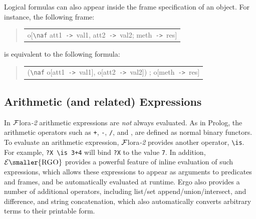\documentclass[11pt]{article}
\newcommand{\FLORA}{{\mbox{\sc ${\cal F}${lora}\rm\emph{-2}}}\xspace}
\newcommand{\ERGO}{\ensuremath{\cal{E}\mbox{\smaller{\sc{RGO}}}}\xspace}
\newcommand{\FLSYSTEM}{\FLORA}
\newenvironment{qrules}{\begin{quote}\tt\begin{tabular}[t]{l}}%
{\end{tabular}\end{quote}}
\newcommand{\mvd}{{\mbox{\tt \,->\,}}}  %
\newcommand{\bs}{\textbackslash}
\newcommand{\RULELOGNAF}{{\texttt{{\bs}naf}}\xspace}
\begin{document}
%
Logical formulas can also appear inside the frame specification of an object. For
instance, the following frame:
\begin{qrules}
o[\RULELOGNAF att1{\mvd}val1, att2{\mvd}val2; meth{\mvd}res]
\end{qrules}
is equivalent to the following formula:
\begin{qrules}
(\RULELOGNAF o[att1{\mvd}val1], o[att2{\mvd}val2]) ; o[meth{\mvd}res]
\end{qrules}


\subsection{Arithmetic (and related) Expressions}


In \FLSYSTEM arithmetic expressions are \emph{not} always evaluated. As in
Prolog, the arithmetic operators such as {\tt +}, {\tt -}, {\tt /}, and
{\tt *}, are defined as normal binary functors. To evaluate an arithmetic
expression, \FLSYSTEM provides another operator, {\tt \bs{}is}.
For example, {\tt ?X \bs{}is 3+4} will bind {\tt ?X} to the value {\tt 7}.
In addition, \ERGO provides a powerful feature of inline evaluation
of such expressions, which allows these expressions to appear as arguments
to predicates and frames, and be automatically evaluated at runtime.
Ergo also provides a number of additional operators, including
list/set append/union/intersect, and difference, and
string concatenation, which also
automatically converts arbitrary terms to their printable form.
\end{document}
